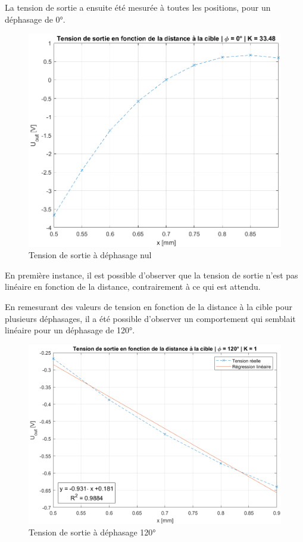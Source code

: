 La tension de sortie a ensuite été mesurée à toutes les positions, pour un déphasage de 0°.
\begin{figure}[H]
    \centering
    \includegraphics[width=15cm]{Images/Seance5/uout1.png}
    \caption{Tension de sortie à déphasage nul}
    \label{fig:uout1}
\end{figure}

En première instance, il est possible d'observer que la tension de sortie n'est pas linéaire en
fonction de la distance, contrairement à ce qui est attendu. 

\vspace{0.2cm}

En remesurant des valeurs de tension en fonction de la distance à la cible pour plusieurs déphasages,
il a été possible d'observer un comportement qui semblait linéaire pour un déphasage de 120°.

\begin{figure}[H]
    \centering
    \includegraphics[width=15cm]{Images/Seance5/uout2.png}
    \caption{Tension de sortie à déphasage 120°}
    \label{fig:uout2}
\end{figure}

